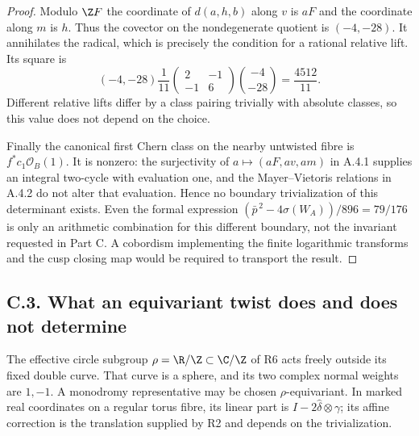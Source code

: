 \begin{proof}
Modulo $\Z F$ the coordinate of $d(a,h,b)$ along $v$ is $aF$
and the coordinate along $m$ is $h$. Thus the covector on the
nondegenerate quotient is $(-4,-28)$. It annihilates the radical,
which is precisely the condition for a rational relative lift.
Its square is
\[
 (-4,-28)\frac1{11}
 \begin{pmatrix}2&-1\\-1&6\end{pmatrix}
 \binom{-4}{-28}=\frac{4512}{11}.
\]
Different relative lifts differ by a class pairing trivially with
absolute classes, so this value does not depend on the choice.

Finally the canonical first Chern class on the nearby untwisted
fibre is $f^*c_1\mathcal O_B(1)$. It is nonzero: the surjectivity of
$a\mapsto(aF,av,am)$ in A.4.1 supplies an integral two-cycle with
evaluation one, and the Mayer--Vietoris relations in A.4.2 do not
alter that evaluation. Hence no boundary trivialization of this
determinant exists. Even the formal expression
$(\bar p^{\,2}-4\sigma(W_A))/896=79/176$ is only an arithmetic
combination for this different boundary, not the invariant requested
in Part C. A cobordism implementing the finite logarithmic transforms
and the cusp closing map would be required to transport the result.
\end{proof}

\subsection{C.3. What an equivariant twist does and does not determine}

\begin{proposition}
The effective circle subgroup $\rho=\R/\Z\subset\C/\Z$ of R6
acts freely outside its fixed double curve. That curve is a sphere,
and its two complex normal weights are $1,-1$. A monodromy
representative may be chosen $\rho$-equivariant. In marked real
coordinates on a regular torus fibre, its linear part is
$I-2\widehat\delta\otimes\gamma$; its affine correction is the
translation supplied by R2 and depends on the trivialization.
\end{proposition}

